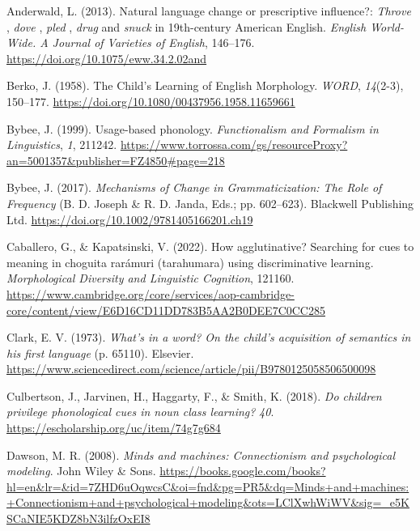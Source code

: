 \documentclass[
  letterpaper,
  DIV=11,
  numbers=noendperiod]{scrartcl}
\newlength{\cslhangindent}
\newenvironment{CSLReferences}[2] %
 {\begin{list}{}{%
  \setlength{\itemindent}{0pt}
  \setlength{\leftmargin}{0pt}
  \setlength{\parsep}{0pt}
  \ifodd #1
   \setlength{\leftmargin}{\cslhangindent}
   \setlength{\itemindent}{-1\cslhangindent}
  \fi
  \setlength{\itemsep}{#2\baselineskip}}}
 {\end{list}}
\begin{document}
\label{refs}
\begin{CSLReferences}{1}{0}
Anderwald, L. (2013). Natural language change or prescriptive
influence?: {\emph{Throve}} , {\emph{dove}} , {\emph{pled}} ,
{\emph{drug}} and {\emph{snuck}} in 19th-century American English.
\emph{English World-Wide. A Journal of Varieties of English}, 146--176.
\url{https://doi.org/10.1075/eww.34.2.02and}

Berko, J. (1958). The Child's Learning of English Morphology.
\emph{{\emph{WORD}}}, \emph{14}(2-3), 150--177.
\url{https://doi.org/10.1080/00437956.1958.11659661}

Bybee, J. (1999). Usage-based phonology. \emph{Functionalism and
Formalism in Linguistics}, \emph{1}, 211242.
\url{https://www.torrossa.com/gs/resourceProxy?an=5001357&publisher=FZ4850\#page=218}

Bybee, J. (2017). \emph{Mechanisms of Change in Grammaticization: The
Role of Frequency} (B. D. Joseph \& R. D. Janda, Eds.; pp. 602--623).
Blackwell Publishing Ltd.
\url{https://doi.org/10.1002/9781405166201.ch19}

Caballero, G., \& Kapatsinski, V. (2022). How agglutinative? Searching
for cues to meaning in choguita rarámuri (tarahumara) using
discriminative learning. \emph{Morphological Diversity and Linguistic
Cognition}, 121160.
\url{https://www.cambridge.org/core/services/aop-cambridge-core/content/view/E6D16CD11DD783B5AA2B0DEE7C0CC285}

Clark, E. V. (1973). \emph{What's in a word? On the child's acquisition
of semantics in his first language} (p. 65110). Elsevier.
\url{https://www.sciencedirect.com/science/article/pii/B9780125058506500098}

Culbertson, J., Jarvinen, H., Haggarty, F., \& Smith, K. (2018).
\emph{Do children privilege phonological cues in noun class learning?}
\emph{40}. \url{https://escholarship.org/uc/item/74g7g684}

Dawson, M. R. (2008). \emph{Minds and machines: Connectionism and
psychological modeling}. John Wiley \& Sons.
\url{https://books.google.com/books?hl=en&lr=&id=7ZHD6uOqwcsC&oi=fnd&pg=PR5&dq=Minds+and+machines:+Connectionism+and+psychological+modeling&ots=LClXwhWiWV&sig=_e5KSCaNIE5KDZ8bN3ilfzOxEI8}


\end{CSLReferences}
\end{document}
